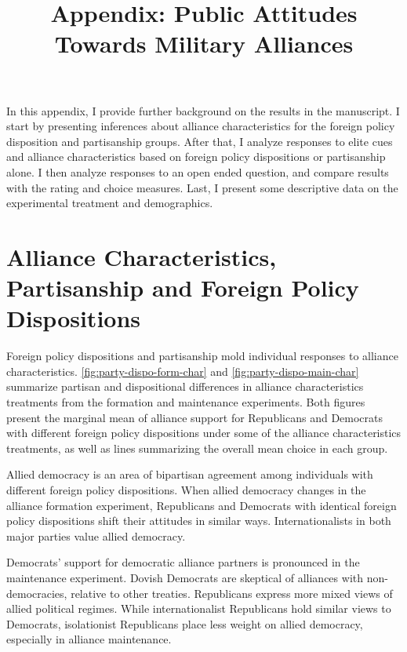 \documentclass[12pt]{article}
\title{\textbf{Appendix: Public Attitudes Towards Military Alliances}}
\author{}
\date{}
\begin{document}
\maketitle 

\doublespace 

\newpage 


In this appendix, I provide further background on the results in the manuscript. 
I start by presenting inferences about alliance characteristics for the foreign policy disposition and partisanship groups. 
After that, I analyze responses to elite cues and alliance characteristics based on foreign policy dispositions or partisanship alone. 
I then analyze responses to an open ended question, and compare results with the rating and choice measures.
Last, I present some descriptive data on the experimental treatment and demographics. 


\tableofcontents


\newpage


\section{Alliance Characteristics, Partisanship and Foreign Policy Dispositions}



Foreign policy dispositions and partisanship mold individual responses to alliance characteristics. 
\autoref{fig:party-dispo-form-char} and \autoref{fig:party-dispo-main-char} summarize partisan and dispositional differences in alliance characteristics treatments from the formation and maintenance experiments. 
Both figures present the marginal mean of alliance support for Republicans and Democrats with different foreign policy dispositions under some of the alliance characteristics treatments, as well as lines summarizing the overall mean choice in each group. 


Allied democracy is an area of bipartisan agreement among individuals with different foreign policy dispositions.
When allied democracy changes in the alliance formation experiment, Republicans and Democrats with identical foreign policy dispositions shift their attitudes in similar ways. 
Internationalists in both major parties value allied democracy. 


Democrats' support for democratic alliance partners is pronounced in the maintenance experiment. 
Dovish Democrats are skeptical of alliances with non-democracies, relative to other treaties. 
Republicans express more mixed views of allied political regimes. 
While internationalist Republicans hold similar views to Democrats, isolationist Republicans place less weight on allied democracy, especially in alliance maintenance. 
\end{document}
